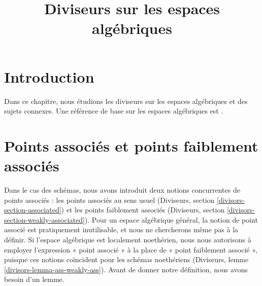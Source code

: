 

%


\title{Diviseurs sur les espaces algébriques}


\maketitle

\label{section-phantom}

\tableofcontents

\section{Introduction}
\label{section-introduction}

\noindent
Dans ce chapitre, nous étudions les diviseurs sur les espaces algébriques et des sujets connexes.
Une référence de base sur les espaces algébriques est \cite{Kn}.









\section{Points associés et points faiblement associés}
\label{section-associated}

\noindent
Dans le cas des schémas, nous avons introduit deux notions concurrentes
de points associés : les points associés au sens usuel
(Diviseurs, section \ref{divisors-section-associated})
et les points faiblement associés
(Diviseurs, section \ref{divisors-section-weakly-associated}).
Pour un espace algébrique général, la notion de point associé
est pratiquement inutilisable, et nous ne chercherons même pas à la définir.
Si l'espace algébrique est localement noethérien, nous nous autorisons
à employer l'expression « point associé » à la place de
« point faiblement associé », puisque ces notions coïncident pour les
schémas noethériens (Diviseurs, lemme \ref{divisors-lemma-ass-weakly-ass}).
Avant de donner notre définition, nous avons besoin d'un lemme.

